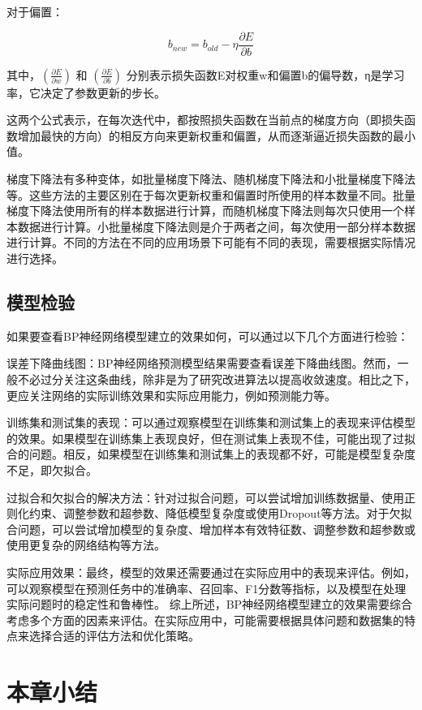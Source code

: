 对于偏置：

\begin{equation}
b_{new} = b_{old} - \eta \frac{\partial E}{\partial b}
\end{equation}

其中，$(\frac{\partial E}{\partial w})$ 和 $(\frac{\partial E}{\partial b})$ 分别表示损失函数E对权重w和偏置b的偏导数，η是学习率，它决定了参数更新的步长。

这两个公式表示，在每次迭代中，都按照损失函数在当前点的梯度方向（即损失函数增加最快的方向）的相反方向来更新权重和偏置，从而逐渐逼近损失函数的最小值。

梯度下降法有多种变体，如批量梯度下降法、随机梯度下降法和小批量梯度下降法等。这些方法的主要区别在于每次更新权重和偏置时所使用的样本数量不同。批量梯度下降法使用所有的样本数据进行计算，而随机梯度下降法则每次只使用一个样本数据进行计算。小批量梯度下降法则是介于两者之间，每次使用一部分样本数据进行计算。不同的方法在不同的应用场景下可能有不同的表现，需要根据实际情况进行选择。
\subsection{模型检验}

如果要查看BP神经网络模型建立的效果如何，可以通过以下几个方面进行检验：

误差下降曲线图：BP神经网络预测模型结果需要查看误差下降曲线图。然而，一般不必过分关注这条曲线，除非是为了研究改进算法以提高收敛速度。相比之下，更应关注网络的实际训练效果和实际应用能力，例如预测能力等。

训练集和测试集的表现：可以通过观察模型在训练集和测试集上的表现来评估模型的效果。如果模型在训练集上表现良好，但在测试集上表现不佳，可能出现了过拟合的问题。相反，如果模型在训练集和测试集上的表现都不好，可能是模型复杂度不足，即欠拟合。

过拟合和欠拟合的解决方法：针对过拟合问题，可以尝试增加训练数据量、使用正则化约束、调整参数和超参数、降低模型复杂度或使用Dropout等方法。对于欠拟合问题，可以尝试增加模型的复杂度、增加样本有效特征数、调整参数和超参数或使用更复杂的网络结构等方法。

实际应用效果：最终，模型的效果还需要通过在实际应用中的表现来评估。例如，可以观察模型在预测任务中的准确率、召回率、F1分数等指标，以及模型在处理实际问题时的稳定性和鲁棒性。
综上所述，BP神经网络模型建立的效果需要综合考虑多个方面的因素来评估。在实际应用中，可能需要根据具体问题和数据集的特点来选择合适的评估方法和优化策略。
\section{本章小结}

